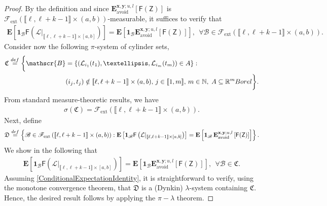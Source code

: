 \documentclass[10pt,a4paper]{amsart}
\begin{document}
\begin{proof}
By the definition and since
$ \mathbf{E}_{\mathrm{avoid}}^{\mathbf{x}, \mathbf{y}; u, l}\left[\mathsf{F}(\mathsf{Z})\right]
$
is  $\mathscr{F}_{\mathrm{ext}}\left(\llbracket \ell, \ell+k-1\rrbracket \times (a,b)\right)$-measurable,
it suffices to  verify that
\begin{align*}
\mathbf{E}\left[\mathbf{1}_{\mathscr{B}}\mathsf{F}\left(\mathcal{L}|_{\llbracket \ell, \ell+k-1 \rrbracket \times [a,b]}\right)\right] = \mathbf{E}\left[\mathbf{1}_{\mathscr{B}}\mathbf{E}_{\mathrm{avoid}}^{\mathbf{x},\mathbf{y};u,l}\left[\mathsf{F}(\mathsf{Z})\right]\right],
    \  \ \forall \mathscr{B}\in\mathscr{F}_{\mathrm{ext}}\left(\llbracket \ell, \ell+k-1\rrbracket \times (a,b)\right).
\end{align*}
Consider now the following $\pi$-system of cylinder sets,
\begin{align*}
\mathfrak{C} \overset{\textnormal{def}}{=}  \bigg\{ \mathscr{B}&=
\left\{\left (\mathcal{L}_{i_1}(t_1), \ldots, \mathcal{L}_{i_m}(t_m)\right) \in A \right\}: \\
&(i_j,t_j) \notin \llbracket \ell, \ell+k-1 \rrbracket \times (a,b),\,j\in\llbracket 1,m\rrbracket,\,
m\in\mathbb{N},\; A \subseteq \mathbb{R}^m \textnormal{ Borel}\bigg\}.
\end{align*}
From standard measure-theoretic results, we have 
\begin{align*}
\sigma\left(\mathfrak{C}\right)=\mathscr{F}_{\mathrm{ext}}\left(\llbracket \ell, \ell+k-1 \rrbracket \times (a,b)\right).
\end{align*}
Next, define
\begin{align*}
\mathfrak{D} \overset{\textnormal{def}}{=}  \left\{ \mathscr{B}\in \mathscr{F}_{\mathrm{ext}}\left(\llbracket \ell, \ell+k-1 \rrbracket \times (a,b)\right): \mathbf{E}\left[\mathbf{1}_{\mathscr{B}}\mathsf{F}\left(\mathcal{L}|_{\llbracket \ell, \ell+k-1\rrbracket \times [a,b]}\right)\right] = \mathbf{E}\left[\mathbf{1}_{\mathscr{B}}\, \mathbf{E}_{\mathrm{avoid}}^{\mathbf{x},\mathbf{y};u,l}\left[\mathsf{F}(\mathsf{Z})\right]\right] \right\}.
\end{align*}
We show in the following that
\begin{align}\label{ConditionalExpectationIdentity}
\mathbf{E}\left[\mathbf{1}_{\mathscr{B}}\mathsf{F}\left(\mathcal{L}|_{\llbracket \ell, \ell+k-1 \rrbracket \times [a,b]}\right)\right] = \mathbf{E}\left[\mathbf{1}_{\mathscr{B}}\mathbf{E}_{\mathrm{avoid}}^{\mathbf{x},\mathbf{y};u,l}\left[\mathsf{F}(\mathsf{Z})\right]\right],
    \  \ \forall \mathscr{B}\in\mathfrak{C}.
\end{align}
Assuming \eqref{ConditionalExpectationIdentity}, it is straightforward to verify, using the monotone convergence theorem, that \(\mathfrak{D}\) is a (Dynkin) \(\lambda\)-system containing $\mathfrak{C}$. Hence, the desired result follows by
applying the %
$\pi-\lambda$ theorem.


\end{proof}
\end{document}
